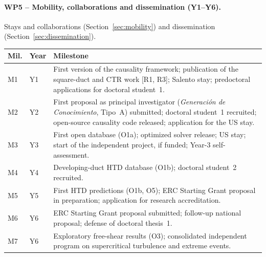 \documentclass[11pt]{article}
\begin{document}
\paragraph{WP5 -- Mobility, collaborations and dissemination (Y1--Y6).} Stays and
collaborations (Section~\ref{sec:mobility}) and dissemination
(Section~\ref{sec:dissemination}).

\begin{center}\small
\begin{tabularx}{\textwidth}{@{}p{0.8cm}p{1.35cm}X@{}}
\toprule
\textbf{Mil.} & \textbf{Year} & \textbf{Milestone} \\
\midrule
M1 & Y1 & First version of the causality framework; publication of the square-duct and CTR work [R1, R3]; Salento stay; predoctoral applications for doctoral student~1. \\
M2 & Y2 & First proposal as principal investigator (\emph{Generaci\'on de Conocimiento}, Tipo~A) submitted; doctoral student~1 recruited; open-source causality code released; application for the US stay. \\
M3 & Y3 & First open database (O1a); optimized solver release; US stay; start of the independent project, if funded; Year-3 self-assessment. \\
M4 & Y4 & Developing-duct HTD database (O1b); doctoral student~2 recruited. \\
M5 & Y5 & First HTD predictions (O1b, O5); ERC Starting Grant proposal in preparation; application for research accreditation. \\
M6 & Y6 & ERC Starting Grant proposal submitted; follow-up national proposal; defense of doctoral thesis~1. \\
M7 & Y6 & Exploratory free-shear results (O3); consolidated independent program on supercritical turbulence and extreme events. \\
\bottomrule
\end{tabularx}
\end{center}
\end{document}
